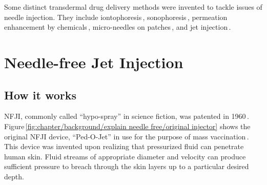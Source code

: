     Some distinct transdermal drug delivery methods were invented to tackle issues of needle injection. They include iontophoresis\,\cite{dhote2012}, sonophoresis\,\cite{bommanan1992}, permeation enhancement by chemicals\,\cite{karande2006}, micro-needles on patches\,\cite{cormier2004}, and jet injection\,\cite{taberner2006}. 

\section{Needle-free Jet Injection}                 \label{Chapter:background/needle-free jet injection}
    
    
    \subsection{How it works}                       \label{Chapter:background/needle-free jet injection/how it works}
    
        \ac{NFJI}, commonly called “hypo-spray” in science fiction, was patented in 1960\,\cite{ismach1962}. Figure\,\ref{fig:chapter/background/explain needle free/original injector} shows the original \acs{NFJI} device, “Ped-O-Jet” in use for the purpose of mass vaccination\,\cite{DictionnairesetEncyclopediessurAcademic}. This device was invented  upon realizing that pressurized fluid can penetrate human skin. Fluid streams of appropriate diameter and velocity can produce sufficient pressure to breach through the skin layers up to a particular desired depth. 
        
